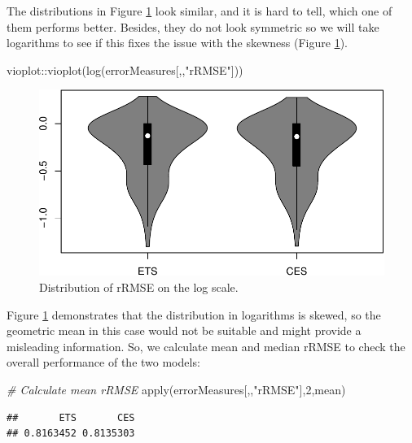 \documentclass[
]{book}
\newenvironment{Shaded}{\begin{snugshade}}{\end{snugshade}}
\newcommand{\CommentTok}[1]{\textcolor[rgb]{0.56,0.35,0.01}{\textit{#1}}}
\newcommand{\DecValTok}[1]{\textcolor[rgb]{0.00,0.00,0.81}{#1}}
\newcommand{\FunctionTok}[1]{\textcolor[rgb]{0.00,0.00,0.00}{#1}}
\newcommand{\NormalTok}[1]{#1}
\newcommand{\SpecialCharTok}[1]{\textcolor[rgb]{0.00,0.00,0.00}{#1}}
\newcommand{\StringTok}[1]{\textcolor[rgb]{0.31,0.60,0.02}{#1}}
\theoremstyle{definition}
\theoremstyle{definition}
\theoremstyle{definition}
\theoremstyle{definition}
\theoremstyle{remark}
\begin{document}
The distributions in Figure \ref{fig:errorMeasuresrRMSEDistLog} look similar, and it is hard to tell, which one of them performs better. Besides, they do not look symmetric so we will take logarithms to see if this fixes the issue with the skewness (Figure \ref{fig:errorMeasuresrRMSEDistLog}).

\begin{Shaded}
\begin{Highlighting}[]
\NormalTok{vioplot}\SpecialCharTok{::}\FunctionTok{vioplot}\NormalTok{(}\FunctionTok{log}\NormalTok{(errorMeasures[,,}\StringTok{"rRMSE"}\NormalTok{]))}
\end{Highlighting}
\end{Shaded}

\begin{figure}
\centering
\includegraphics{adam_files/figure-latex/errorMeasuresrRMSEDistLog-1.pdf}
\caption{\label{fig:errorMeasuresrRMSEDistLog}Distribution of rRMSE on the log scale.}
\end{figure}

Figure \ref{fig:errorMeasuresrRMSEDistLog} demonstrates that the distribution in logarithms is skewed, so the geometric mean in this case would not be suitable and might provide a misleading information. So, we calculate mean and median rRMSE to check the overall performance of the two models:

\begin{Shaded}
\begin{Highlighting}[]
\CommentTok{\# Calculate mean rRMSE}
\FunctionTok{apply}\NormalTok{(errorMeasures[,,}\StringTok{"rRMSE"}\NormalTok{],}\DecValTok{2}\NormalTok{,mean)}
\end{Highlighting}
\end{Shaded}

\begin{verbatim}
##       ETS       CES 
## 0.8163452 0.8135303
\end{verbatim}
\end{document}
